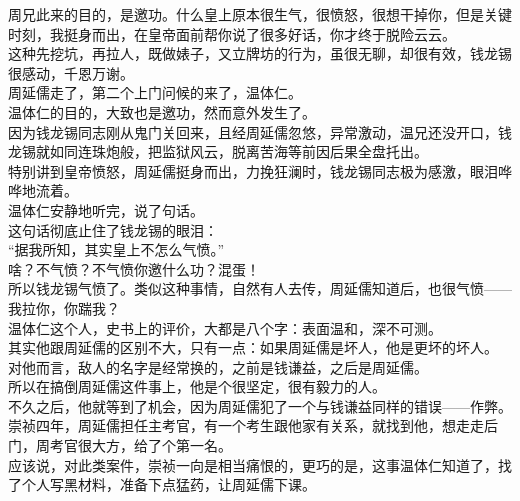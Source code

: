 \begin{multicols}{\theparacolNo}
周兄此来的目的，是邀功。什么皇上原本很生气，很愤怒，很想干掉你，但是关键时刻，我挺身而出，在皇帝面前帮你说了很多好话，你才终于脱险云云。\\

这种先挖坑，再拉人，既做婊子，又立牌坊的行为，虽很无聊，却很有效，钱龙锡很感动，千恩万谢。\\

周延儒走了，第二个上门问候的来了，温体仁。\\

温体仁的目的，大致也是邀功，然而意外发生了。\\

因为钱龙锡同志刚从鬼门关回来，且经周延儒忽悠，异常激动，温兄还没开口，钱龙锡就如同连珠炮般，把监狱风云，脱离苦海等前因后果全盘托出。\\

特别讲到皇帝愤怒，周延儒挺身而出，力挽狂澜时，钱龙锡同志极为感激，眼泪哗哗地流着。\\

温体仁安静地听完，说了句话。\\

这句话彻底止住了钱龙锡的眼泪：\\

“据我所知，其实皇上不怎么气愤。”\\

啥？不气愤？不气愤你邀什么功？混蛋！\\

所以钱龙锡气愤了。类似这种事情，自然有人去传，周延儒知道后，也很气愤——我拉你，你踹我？\\

温体仁这个人，史书上的评价，大都是八个字：表面温和，深不可测。\\

其实他跟周延儒的区别不大，只有一点：如果周延儒是坏人，他是更坏的坏人。\\

对他而言，敌人的名字是经常换的，之前是钱谦益，之后是周延儒。\\

所以在搞倒周延儒这件事上，他是个很坚定，很有毅力的人。\\

不久之后，他就等到了机会，因为周延儒犯了一个与钱谦益同样的错误——作弊。\\

崇祯四年，周延儒担任主考官，有一个考生跟他家有关系，就找到他，想走走后门，周考官很大方，给了个第一名。\\

应该说，对此类案件，崇祯一向是相当痛恨的，更巧的是，这事温体仁知道了，找了个人写黑材料，准备下点猛药，让周延儒下课。\\


\end{multicols}
